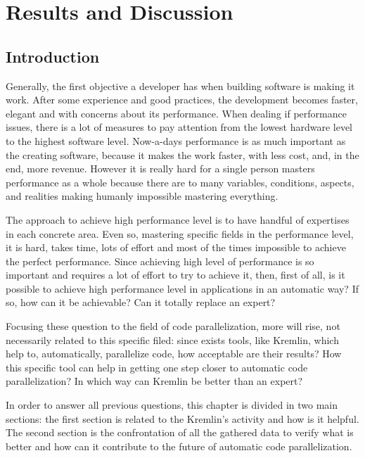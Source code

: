 \chapter{Results and Discussion}\label{chap:chap5}

\section*{}

\section{Introduction}

Generally, the first objective a developer has when building software is making it work. After some experience and good practices, the development becomes faster, elegant and with concerns about its performance. When dealing if performance issues, there is a lot of measures to pay attention from the lowest hardware level to the highest software level. Now-a-days performance is as much important as the creating software, because it makes the work faster, with less cost, and, in the end, more revenue. However it is really hard for a single person masters performance as a whole because there are to many variables, conditions, aspects, and realities making humanly impossible mastering everything.

The approach to achieve high performance level is to have handful of expertises in each concrete area. Even so, mastering specific fields in the performance level, it is hard, takes time, lots of effort and most of the times impossible to achieve the perfect performance. Since achieving high level of performance is so important and requires a lot of effort to try to achieve it, then, first of all, is it possible to achieve high performance level in applications in an automatic way? If so, how can it be achievable? Can it totally replace an expert?

Focusing these question to the field of code parallelization, more will rise, not necessarily related to this specific filed: since exists tools, like Kremlin, which help to, automatically, parallelize code, how acceptable are their results? How this specific tool can help in getting one step closer to automatic code parallelization? In which way can Kremlin be better than an expert?

In order to answer all previous questions, this chapter is divided in two main sections: the first section is related to the Kremlin's activity and how is it helpful. The second section is the confrontation of all the gathered data to verify what is better and how can it contribute to the future of automatic code parallelization. 


